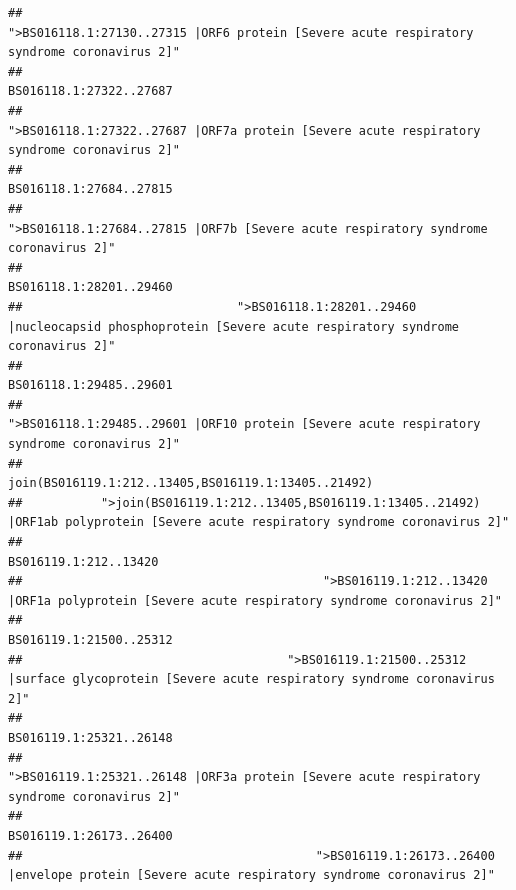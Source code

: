 \documentclass[
]{article}
\begin{document}
\begin{verbatim}
##                                             ">BS016118.1:27130..27315 |ORF6 protein [Severe acute respiratory syndrome coronavirus 2]" 
##                                                                                                                BS016118.1:27322..27687 
##                                            ">BS016118.1:27322..27687 |ORF7a protein [Severe acute respiratory syndrome coronavirus 2]" 
##                                                                                                                BS016118.1:27684..27815 
##                                                    ">BS016118.1:27684..27815 |ORF7b [Severe acute respiratory syndrome coronavirus 2]" 
##                                                                                                                BS016118.1:28201..29460 
##                              ">BS016118.1:28201..29460 |nucleocapsid phosphoprotein [Severe acute respiratory syndrome coronavirus 2]" 
##                                                                                                                BS016118.1:29485..29601 
##                                            ">BS016118.1:29485..29601 |ORF10 protein [Severe acute respiratory syndrome coronavirus 2]" 
##                                                                                    join(BS016119.1:212..13405,BS016119.1:13405..21492) 
##           ">join(BS016119.1:212..13405,BS016119.1:13405..21492) |ORF1ab polyprotein [Severe acute respiratory syndrome coronavirus 2]" 
##                                                                                                                  BS016119.1:212..13420 
##                                          ">BS016119.1:212..13420 |ORF1a polyprotein [Severe acute respiratory syndrome coronavirus 2]" 
##                                                                                                                BS016119.1:21500..25312 
##                                     ">BS016119.1:21500..25312 |surface glycoprotein [Severe acute respiratory syndrome coronavirus 2]" 
##                                                                                                                BS016119.1:25321..26148 
##                                            ">BS016119.1:25321..26148 |ORF3a protein [Severe acute respiratory syndrome coronavirus 2]" 
##                                                                                                                BS016119.1:26173..26400 
##                                         ">BS016119.1:26173..26400 |envelope protein [Severe acute respiratory syndrome coronavirus 2]" 

\end{verbatim}
\end{document}
